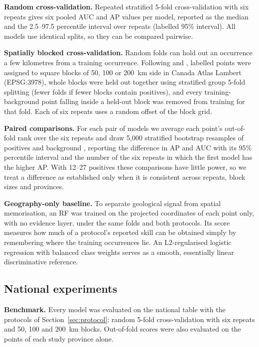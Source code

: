 \documentclass[pdflatex,sn-apa]{sn-jnl}
\begin{document}
\textbf{Random cross-validation.} Repeated stratified 5-fold cross-validation with six repeats gives six pooled AUC and AP values per model, reported as the median and the 2.5--97.5 percentile interval over repeats (labelled 95\% interval). All models use identical splits, so they can be compared pairwise.

\textbf{Spatially blocked cross-validation.} Random folds can hold out an occurrence a few kilometres from a training occurrence. Following \citet{Roberts2017} and \citet{Valavi2019}, labelled points were assigned to square blocks of 50, 100 or 200~km side in Canada Atlas Lambert (EPSG:3978), whole blocks were held out together using stratified group 5-fold splitting (fewer folds if fewer blocks contain positives), and every training-background point falling inside a held-out block was removed from training for that fold. Each of six repeats uses a random offset of the block grid.

\textbf{Paired comparisons.} For each pair of models we average each point's out-of-fold rank over the six repeats and draw 5,000 stratified bootstrap resamples of positives and background \citep{Efron1993}, reporting the difference in AP and AUC with its 95\% percentile interval and the number of the six repeats in which the first model has the higher AP. With 12--27 positives these comparisons have little power, so we treat a difference as established only when it is consistent across repeats, block sizes and provinces.

\textbf{Geography-only baseline.} To separate geological signal from spatial memorisation, an RF was trained on the projected coordinates of each point only, with no evidence layer, under the same folds and both protocols. Its score measures how much of a protocol's reported skill can be obtained simply by remembering where the training occurrences lie. An L2-regularised logistic regression with balanced class weights serves as a smooth, essentially linear discriminative reference.

\subsection{National experiments}\label{sec:national-methods}

\textbf{Benchmark.} Every model was evaluated on the national table with the protocols of Section~\ref{sec:protocol}: random 5-fold cross-validation with six repeats and 50, 100 and 200~km blocks. Out-of-fold scores were also evaluated on the points of each study province alone.
\end{document}
